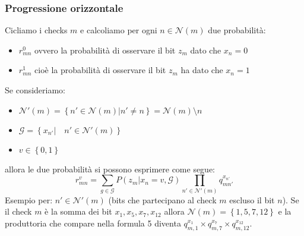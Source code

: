 \documentclass{article}
\begin{document}
	\subsubsection{Progressione orizzontale}
	Cicliamo i checks $m$ e calcoliamo per ogni $n \in \mathcal{N}(m)$ due probabilità:
	\begin{itemize}
		\item $r^0_{mn}$ ovvero la probabilità di osservare il bit $z_m$ dato che $x_n =0$
		\item $r^1_{mn}$ cioè la probabilità di osservare il bit $z_m$ ha dato che $x_n =1$
	\end{itemize}
	Se consideriamo:
	\begin{itemize}
		\item $\mathcal{N}'(m)=\left\{n' \in \mathcal{N}(m)| n' \neq n\right\} = \mathcal{N}(m) \setminus n$
		\item $\mathcal{G}=\left\{x_{n'} | \quad n' \in \mathcal{N}'(m) \right\}$ 
		\item $v \in \left\{0,1\right\}$
	\end{itemize}
	allora le due probabilità si possono esprimere come segue:
	\begin{equation}
		r^v_{mn}= \sum_{g \in \mathcal{G}} P(z_m|x_n = v, \mathcal{G}) \prod_{n' \in \mathcal{N}'(m)} q^{x_{n'}}_{mn'}
	\end{equation}
	Esempio per: $n' \in \mathcal{N}'(m)$ (bits che partecipano al check $m$ escluso il bit $n$). Se il check $m$ è la somma dei bit $x_1, x_5, x_7, x_{12}$ allora $\mathcal{N}(m) = \left\{ 1,5,7,12\right\}$ e la produttoria che compare nella formula 5 diventa $q_{m,1}^{x_1} \times q_{m, 7}^{x_7} \times q_{m,12}^{x_{12}}$.
	
\end{document}
